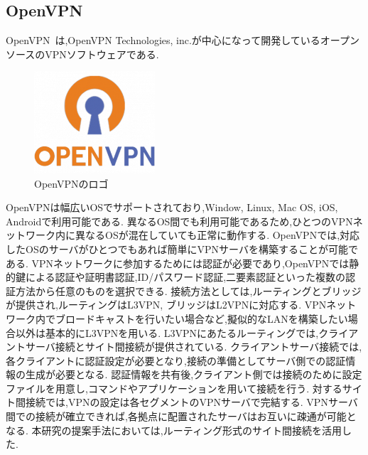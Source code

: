 \subsection{OpenVPN}

OpenVPN~\cite{OpenVPN}は,OpenVPN Technologies, inc.が中心になって開発しているオープンソースのVPNソフトウェアである.

\begin{figure}[htbp]
\begin{center}
    \includegraphics[width=0.4\textwidth]{./figures/openvpn-logo.png}
    \caption{OpenVPNのロゴ}
\end{center}
\end{figure}

OpenVPNは幅広いOSでサポートされており,Window, Linux, Mac OS, iOS, Androidで利用可能である.
異なるOS間でも利用可能であるため,ひとつのVPNネットワーク内に異なるOSが混在していても正常に動作する.
OpenVPNでは,対応したOSのサーバがひとつでもあれば簡単にVPNサーバを構築することが可能である.
VPNネットワークに参加するためには認証が必要であり,OpenVPNでは静的鍵による認証や証明書認証,ID/パスワード認証,二要素認証といった複数の認証方法から任意のものを選択できる.
接続方法としては,ルーティングとブリッジが提供され,ルーティングはL3VPN, ブリッジはL2VPNに対応する.
VPNネットワーク内でブロードキャストを行いたい場合など,擬似的なLANを構築したい場合以外は基本的にL3VPNを用いる.
L3VPNにあたるルーティングでは,クライアントサーバ接続とサイト間接続が提供されている.
クライアントサーバ接続では,各クライアントに認証設定が必要となり,接続の準備としてサーバ側での認証情報の生成が必要となる.
認証情報を共有後,クライアント側では接続のために設定ファイルを用意し,コマンドやアプリケーションを用いて接続を行う.
対するサイト間接続では,VPNの設定は各セグメントのVPNサーバで完結する.
VPNサーバ間での接続が確立できれば,各拠点に配置されたサーバはお互いに疎通が可能となる.
本研究の提案手法においては,ルーティング形式のサイト間接続を活用した.
